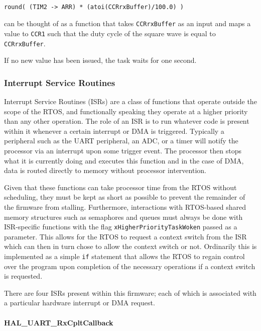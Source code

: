 \begin{listing}
\begin{verbatim}

round( (TIM2 -> ARR) * (atoi(CCRrxBuffer)/100.0) )

\end{verbatim}
\label{listing:3}
\end{listing}

can be thought of as a function that takes \verb|CCRrxBuffer| as an input and maps a value to \verb|CCR1| such that the duty cycle of the square wave is equal to \verb|CCRrxBuffer|.

If no new value has been issued, the task waits for one second.

\subsubsection{Interrupt Service Routines}

Interrupt Service Routines (ISRs) are a class of functions that operate outside the scope of the RTOS, and functionally speaking they operate at a higher priority than any other operation. The role of an ISR is to run whatever code is present within it whenever a certain interrupt or DMA is triggered. Typically a peripheral such as the UART peripheral, an ADC, or a timer will notify the processor via an interrupt upon some trigger event. The processor then stops what it is currently doing and executes this function and in the case of DMA, data is routed directly to memory without processor intervention.

Given that these functions can take processor time from the RTOS without scheduling, they must be kept as short as possible to prevent the remainder of the firmware from stalling. Furthermore, interactions with RTOS-based shared memory structures such as semaphores and queues must always be done with ISR-specific functions with the flag \verb|xHigherPriorityTaskWoken| passed as a parameter. This allows for the RTOS to request a context switch from the ISR which can then in turn chose to allow the context switch or not. Ordinarily this is implemented as a simple \verb|if| statement that allows the RTOS to regain control over the program upon completion of the necessary operations if a context switch is requested.

There are four ISRs present within this firmware; each of which is associated with a particular hardware interrupt or DMA request.

\paragraph{HAL\_UART\_RxCpltCallback}

